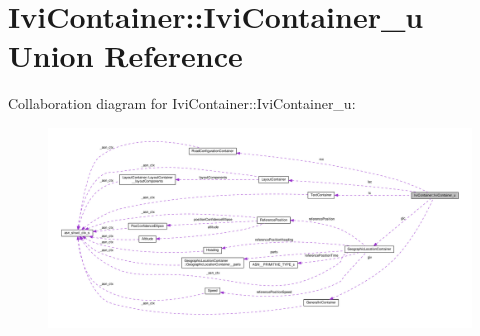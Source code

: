 \hypertarget{unionIviContainer_1_1IviContainer__u}{}\section{Ivi\+Container\+:\+:Ivi\+Container\+\_\+u Union Reference}
\label{unionIviContainer_1_1IviContainer__u}


Collaboration diagram for Ivi\+Container\+:\+:Ivi\+Container\+\_\+u\+:\nopagebreak
\begin{figure}[H]
\begin{center}
\leavevmode
\includegraphics[width=350pt]{unionIviContainer_1_1IviContainer__u__coll__graph}
\end{center}
\end{figure}
